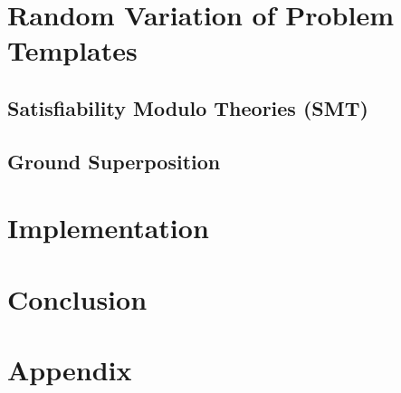 \documentclass[12pt]{llncs}
\begin{document}



\section{Random Variation of Problem Templates}\label{sec:smtqf}

\subsection{Satisfiability Modulo Theories (SMT)}\label{sec:smt}





\subsection{Ground Superposition}\label{sec:qf}

\label{sec:gs}



\section{Implementation}\label{sec:implementation}



\section{Conclusion}










\appendix
\section{Appendix}

\end{document}
